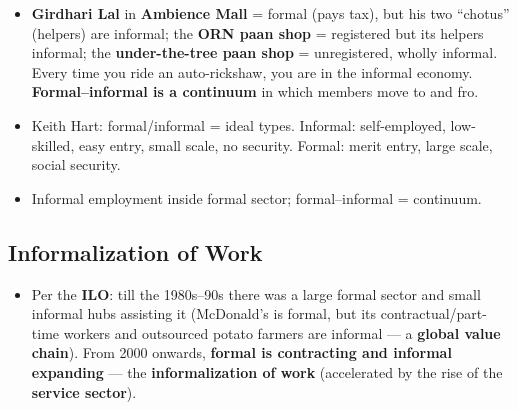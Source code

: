 \begin{ExampleBox}
\begin{itemize}
    \item \textbf{Girdhari Lal} in \textbf{Ambience Mall} = formal (pays tax), but his two ``chotus'' (helpers) are informal; the \textbf{ORN paan shop} = registered but its helpers informal; the \textbf{under-the-tree paan shop} = unregistered, wholly informal. Every time you ride an auto-rickshaw, you are in the informal economy. \textbf{Formal--informal is a continuum} in which members move to and fro.
\end{itemize}
\end{ExampleBox}

\begin{QuickRevision}
\begin{itemize}
    \item Keith Hart: formal/informal = ideal types. Informal: self-employed, low-skilled, easy entry, small scale, no security. Formal: merit entry, large scale, social security.
    \item Informal employment inside formal sector; formal--informal = continuum.
\end{itemize}
\end{QuickRevision}

\sectiondivider

\subsection{Informalization of Work}

\begin{KeyConcept}
\begin{itemize}
    \item Per the \textbf{ILO}: till the 1980s--90s there was a large formal sector and small informal hubs assisting it (McDonald's is formal, but its contractual/part-time workers and outsourced potato farmers are informal --- a \textbf{global value chain}). From 2000 onwards, \textbf{formal is contracting and informal expanding} --- the \textbf{informalization of work} (accelerated by the rise of the \textbf{service sector}).
\end{itemize}
\end{KeyConcept}


